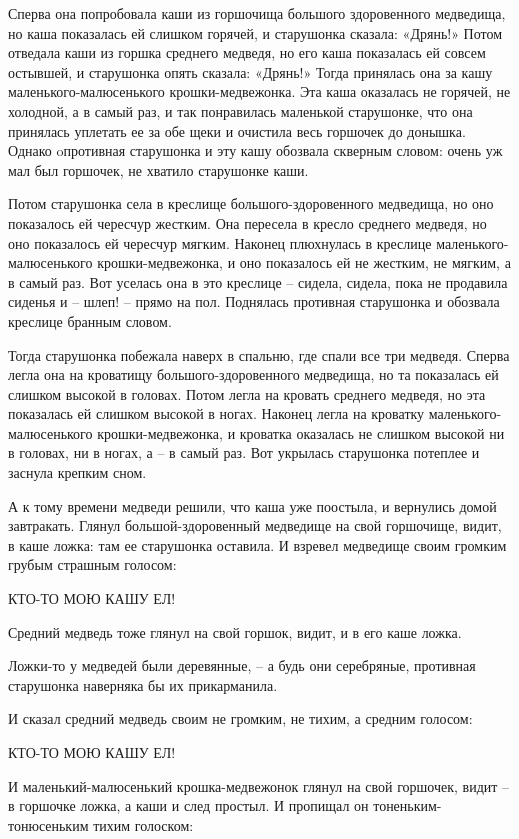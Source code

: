 Сперва она попробовала каши из горшочища большого здоровенного медведища, но каша показалась ей слишком горячей, и старушонка сказала: «Дрянь!» Потом отведала каши из горшка среднего медведя, но его каша показалась ей совсем остывшей, и старушонка опять сказала: «Дрянь!» Тогда принялась она за кашу маленького-малюсенького крошки-медвежонка. Эта каша оказалась не горячей, не холодной, а в самый раз, и так понравилась маленькой старушонке, что она принялась уплетать ее за обе щеки и очистила весь горшочек до донышка. Однако oпротивная старушонка и эту кашу обозвала скверным словом: очень уж мал был горшочек, не хватило старушонке каши.

Потом старушонка села в креслище большого-здоровенного медведища, но оно показалось ей чересчур жестким. Она пересела в кресло среднего медведя, но оно показалось ей чересчур мягким. Наконец плюхнулась в креслице маленького-малюсенького крошки-медвежонка, и оно показалось ей не жестким, не мягким, а в самый раз. Вот уселась она в это креслице – сидела, сидела, пока не продавила сиденья и – шлеп! – прямо на пол. Поднялась противная старушонка и обозвала креслице бранным словом.

Тогда старушонка побежала наверх в спальню, где спали все три медведя. Сперва легла она на кроватищу большого-здоровенного медведища, но та показалась ей слишком высокой в головах. Потом легла на кровать среднего медведя, но эта показалась ей слишком высокой в ногах. Наконец легла на кроватку маленького-малюсенького крошки-медвежонка, и кроватка оказалась не слишком высокой ни в головах, ни в ногах, а – в самый раз. Вот укрылась старушонка потеплее и заснула крепким сном.

А к тому времени медведи решили, что каша уже поостыла, и вернулись домой завтракать. Глянул большой-здоровенный медведище на свой горшочище, видит, в каше ложка: там ее старушонка оставила. И взревел медведище своим громким грубым страшным голосом:

КТО-ТО МОЮ КАШУ ЕЛ!

Средний медведь тоже глянул на свой горшок, видит, и в его каше ложка.

Ложки-то у медведей были деревянные, – а будь они серебряные, противная старушонка наверняка бы их прикарманила.

И сказал средний медведь своим не громким, не тихим, а средним голосом:

КТО-ТО МОЮ КАШУ ЕЛ!

И маленький-малюсенький крошка-медвежонок глянул на свой горшочек, видит – в горшочке ложка, а каши и след простыл. И пропищал он тоненьким-тонюсеньким тихим голоском:

